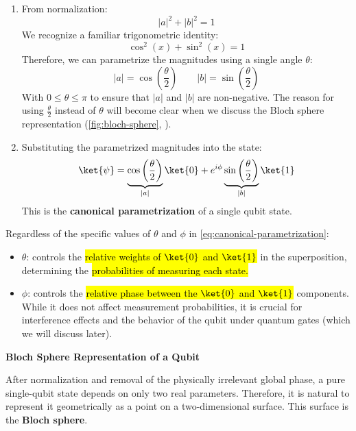 \begin{enumerate}
    \item From normalization:
    \begin{equation*}
        \left|a\right|^{2} + \left|b\right|^{2} = 1
    \end{equation*}
    We recognize a familiar trigonometric identity:
    \begin{equation*}
        \cos^2 \left(x\right) + \sin^2 \left(x\right) = 1
    \end{equation*}
    Therefore, we can parametrize the magnitudes using a single angle $\theta$:
    \begin{equation*}
        \left|a\right| = \cos\left(\frac{\theta}{2}\right) \qquad \left|b\right| = \sin\left(\frac{\theta}{2}\right)
    \end{equation*}
    With $0 \leq \theta \leq \pi$ to ensure that $\left|a\right|$ and $\left|b\right|$ are non-negative. The reason for using $\frac{\theta}{2}$ instead of $\theta$ will become clear when we discuss the Bloch sphere representation (\autoref{fig:bloch-sphere}, ).


    \item Substituting the parametrized magnitudes into the state:
    \begin{equation}\label{eq:canonical-parametrization}
        \ket{\psi} = \underbrace{\cos\left(\frac{\theta}{2}\right)}_{\left|a\right|}\ket{0} + e^{i\phi}\underbrace{\sin\left(\frac{\theta}{2}\right)}_{\left|b\right|} \ket{1}
    \end{equation}
    This is the \textbf{canonical parametrization} of a single qubit state.
\end{enumerate}
Regardless of the specific values of $\theta$ and $\phi$ in \autoref{eq:canonical-parametrization}:
\begin{itemize}
    \item $\theta$: controls the \hl{relative weights of $\ket{0}$ and $\ket{1}$} in the superposition, determining the \hl{probabilities of measuring each state.}
    \item $\phi$: controls the \hl{relative phase between the $\ket{0}$ and $\ket{1}$} components. While it does not affect measurement probabilities, it is crucial for interference effects and the behavior of the qubit under quantum gates (which we will discuss later).
\end{itemize}

\begin{flushleft}
    \textcolor{Green3}{ \textbf{Bloch Sphere Representation of a Qubit}}
\end{flushleft}
After normalization and removal of the physically irrelevant global phase, a pure single-qubit state depends on only two real parameters. Therefore, it is natural to represent it geometrically as a point on a two-dimensional surface. This surface is the \textbf{Bloch sphere}.

